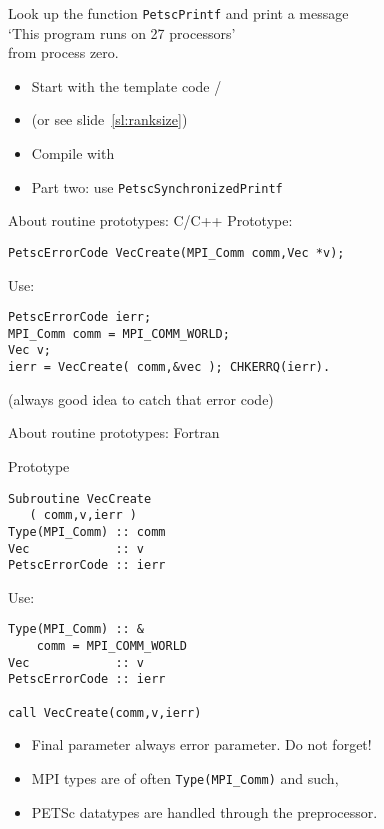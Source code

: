 \begin{exerciseframe}[hello]
Look up the function \lstinline{PetscPrintf} and print a message\\
`This program runs on 27 processors'\\
from process zero.

\begin{itemize}
\item Start with the template code /
\item (or see slide~\ref{sl:ranksize})
\item Compile with 
\item Part two: use \lstinline{PetscSynchronizedPrintf}
\end{itemize}
\end{exerciseframe}


\begin{numberedframe}{About routine prototypes: C/C++}
  \label{sec:protos}
Prototype:
\begin{lstlisting}
PetscErrorCode VecCreate(MPI_Comm comm,Vec *v);
\end{lstlisting}
Use:
\begin{lstlisting}
PetscErrorCode ierr;
MPI_Comm comm = MPI_COMM_WORLD;
Vec v;
ierr = VecCreate( comm,&vec ); CHKERRQ(ierr).
\end{lstlisting}
(always good idea to catch that error code)
\end{numberedframe}

\lstset{language=Fortran}
\begin{fortran}
\begin{numberedframe}{About routine prototypes: Fortran}
\begin{multicols}{2}
\footnotesize
Prototype
\begin{lstlisting}
Subroutine VecCreate
   ( comm,v,ierr )
Type(MPI_Comm) :: comm
Vec            :: v
PetscErrorCode :: ierr
\end{lstlisting}
Use:
\begin{lstlisting}
Type(MPI_Comm) :: &
    comm = MPI_COMM_WORLD
Vec            :: v
PetscErrorCode :: ierr

call VecCreate(comm,v,ierr)
\end{lstlisting}
\columnbreak
\begin{itemize}
\item Final parameter always error parameter. Do not forget!
\item MPI types are of often \lstinline{Type(MPI_Comm)} and such,
\item PETSc datatypes are handled through the preprocessor.
\end{itemize}
\hbox{}\vfill\hbox{}
\end{multicols}
\end{numberedframe}
\end{fortran}

